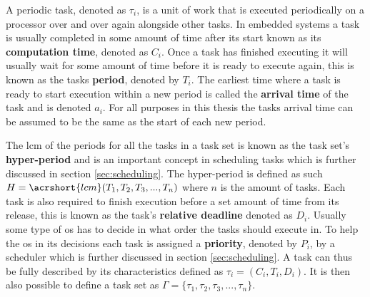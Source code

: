\documentclass{kththesis}
\begin{document}
A periodic task, denoted as $\tau_i$, is a unit of work that is executed periodically on a processor
over and over again alongside other tasks. In embedded systems a task is usually completed in some
amount of time after its start known as its \textbf{computation time}, denoted as $C_i$. Once a task
has finished executing it will usually wait for some amount of time before it is ready to execute
again, this is known as the tasks \textbf{period}, denoted by $T_i$. The earliest time where a task
is ready to start execution within a new period is called the \textbf{arrival time} of the task and
is denoted $ a_i $.  For all purposes in this thesis the tasks arrival time can be assumed to be the
same as the start of each new period.

The \acrfull{lcm} of the periods for all the tasks in a task set is known as the task set's
\textbf{hyper-period} and is an important concept in scheduling tasks which is further discussed
in section \ref{sec:scheduling}. The hyper-period is defined as such $H = \acrshort{lcm}(T_1, T_2, T_3,
..., T_n)$ where $n$ is the amount of tasks. Each task is also required to finish execution before a
set amount of time from its release, this is known as the task's \textbf{relative deadline} denoted
as $D_i$. Usually some type of \acrfull{os} has to decide in what order the tasks should execute
in. To help the \acrshort{os} in its decisions each task is assigned a \textbf{priority}, denoted by
$P_i$, by a scheduler which is further discussed in section \ref{sec:scheduling}. A task can thus
be fully described by its characteristics defined as $\tau_i = (C_i, T_i, D_i)$. It is then also
possible to define a task set as $ \Gamma = \{\tau_1, \tau_2, \tau_3, ..., \tau_n\} $. 
\end{document}
